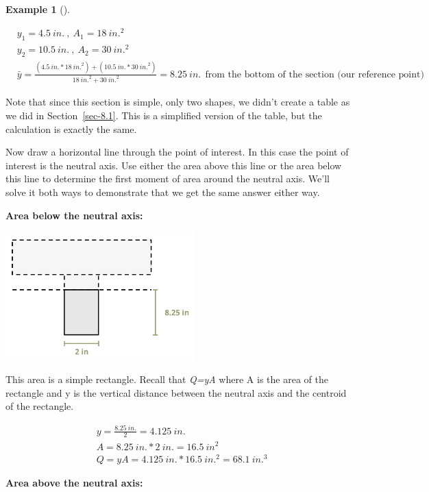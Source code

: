 \documentclass[
  letterpaper,
  DIV=11,
  numbers=noendperiod]{scrreprt}
\theoremstyle{definition}
\newtheorem{example}{Example}[chapter]
\theoremstyle{remark}
\begin{document}
\begin{tcolorbox}
\begin{example}[]
\begin{tcolorbox}
\[
\begin{aligned}
& y_1=4.5{~in.}~,~ A_1=18{~in.}^2 \\
& y_2=10.5{~in.}~,~ A_2=30{~in.}^2 \\
& \bar{y}=\frac{(4.5{~in.} * 18{~in.}^2)+(10.5{~in.} * 30{~in.}^2)}{18{~in.}^2+30{~in.}^2}=8.25{~in.}~~\text{from the bottom of the section (our reference point) }
\end{aligned}
\]

Note that since this section is simple, only two shapes, we didn't
create a table as we did in Section~\ref{sec-8.1}. This is a simplified
version of the table, but the calculation is exactly the same.

Now draw a horizontal line through the point of interest. In this case
the point of interest is the neutral axis. Use either the area above
this line or the area below this line to determine the first moment of
area around the neutral axis. We'll solve it both ways to demonstrate
that we get the same answer either way.

\textbf{Area below the neutral axis:}

\begin{center}
\includegraphics[width=2.88542in,height=\textheight]{images/CH10 PNGs/example 10.1 part 3.png}
\end{center}

This area is a simple rectangle. Recall that \emph{Q=yA} where A is the
area of the rectangle and y is the vertical distance between the neutral
axis and the centroid of the rectangle.

\[
\begin{aligned}
& y=\frac{8.25{~in.}}{2}=4.125{~in.}  \\
& A=8.25{~in.} * 2{~in.}=16.5{~in} ^2 \\
& Q=y A=4.125{~in.} * 16.5{~in.}^2=68.1{~in.}^3
\end{aligned}
\]

\textbf{Area above the neutral axis:}


\end{tcolorbox}
\end{example}
\end{tcolorbox}
\end{document}
